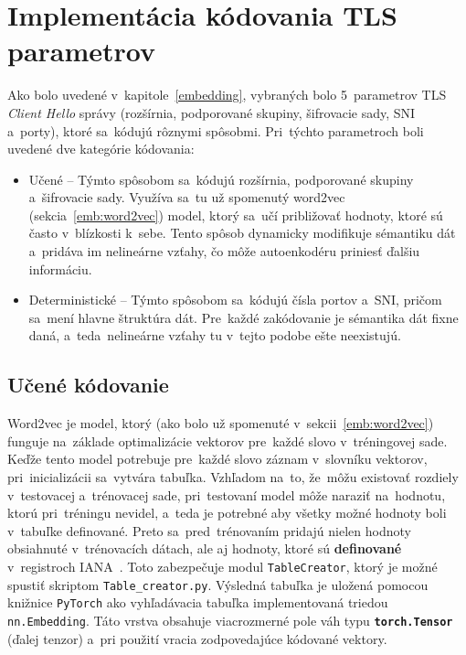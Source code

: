 \section{Implementácia kódovania TLS parametrov}
Ako bolo uvedené v~kapitole~\ref{embedding}, vybraných bolo 5~parametrov TLS \textit{Client Hello} správy (rozšírnia, podporované skupiny, šifrovacie sady, SNI a~porty), ktoré sa~kódujú rôznymi spôsobmi. Pri~týchto parametroch boli uvedené dve kategórie kódovania:
\begin{itemize}
    \item Učené -- Týmto spôsobom sa~kódujú rozšírnia, podporované skupiny a~šifrovacie sady.  Využíva sa~tu už spomenutý word2vec (sekcia~\ref{emb:word2vec}) model, ktorý sa~učí približovať hodnoty, ktoré sú často v~blízkosti k~sebe. Tento spôsob dynamicky modifikuje sémantiku dát a~pridáva im nelineárne vzťahy, čo môže autoenkodéru priniesť ďalšiu informáciu.
    \item Deterministické -- Týmto spôsobom sa~kódujú čísla portov a~SNI, pričom sa~mení hlavne štruktúra dát. Pre~každé zakódovanie je sémantika dát fixne daná, a~teda~nelineárne vzťahy tu v~tejto podobe ešte neexistujú.
\end{itemize}

\subsection{Učené kódovanie}
Word2vec je model, ktorý (ako bolo už spomenuté v~sekcii~\ref{emb:word2vec}) funguje na~základe optimalizácie vektorov pre~každé slovo v~tréningovej sade. Keďže tento model potrebuje pre~každé slovo záznam v~slovníku vektorov, pri~inicializácii sa~vytvára tabuľka. Vzhľadom na~to, že~môžu existovať rozdiely v~testovacej a~trénovacej sade, pri~testovaní model môže naraziť na~hodnotu, ktorú pri~tréningu nevidel, a~teda je potrebné aby všetky možné hodnoty boli v~tabuľke definované. Preto sa~pred~trénovaním pridajú nielen hodnoty obsiahnuté v~trénovacích dátach, ale aj hodnoty, ktoré sú \textbf{definované} v~registroch IANA~\cite{iana_tls_parameters, iana_tls_extensions}. Toto zabezpečuje modul \texttt{TableCreator}, ktorý je možné spustiť skriptom \texttt{Table\_creator.py}. Výsledná tabuľka je uložená pomocou knižnice \texttt{PyTorch} ako vyhľadávacia tabuľka implementovaná triedou \texttt{nn.Embedding}. Táto vrstva obsahuje viacrozmerné pole váh typu \textbf{\texttt{torch.Tensor}} (ďalej tenzor) a~pri použití vracia zodpovedajúce kódované vektory.

